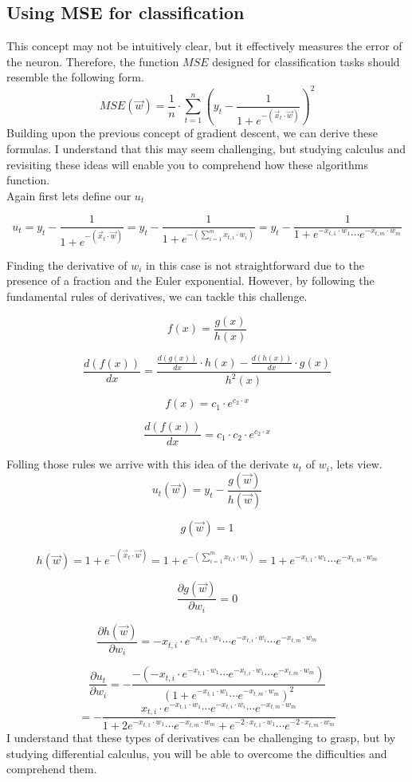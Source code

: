 \subsection{Using MSE for classification}
This concept may not be intuitively clear, but it effectively measures the error of the neuron.
Therefore, the function $MSE$ designed for classification tasks should resemble the following form.
\[
MSE(\vec{w}) = \frac{1}{n} \cdot \sum_{t = 1}^{n}(y_t - \frac{1}{1 + e^{-(\vec{x}_t \cdot \vec{w})}})^2
\]
Building upon the previous concept of gradient descent, we can derive these formulas. I understand that
this may seem challenging, but studying calculus and revisiting these ideas will enable you to comprehend
how these algorithms function.\\
Again first lets define our $u_t$

\[
u_t = y_t - \frac{1}{1 + e^{-(\vec{x}_t \cdot \vec{w})}} = y_t - \frac{1}{1 + e^{-(\sum_{i = 1}^m x_{t, i} \cdot w_i)}}
= y_t - \frac{1}{1 + e^{-x_{t, 1} \cdot w_1} \cdots e^{-x_{t, m} \cdot w_m}}
\]

Finding the derivative of $w_i$ in this case is not straightforward due to the presence of a fraction and
the Euler exponential. However, by following the fundamental rules of derivatives, we can tackle this challenge.

\[
f(x) = \frac{g(x)}{h(x)}
\]

\[
\frac{d(f(x))}{dx} = \frac{\frac{d(g(x))}{dx} \cdot h(x) - \frac{d(h(x))}{dx} \cdot g(x)}{h^2(x)}
\]

\[
f(x) = c_1 \cdot e^{c_2 \cdot x}
\]

\[
\frac{d(f(x))}{dx} = c_1 \cdot c_2 \cdot e^{c_2 \cdot x}
\]

Folling those rules we arrive with this idea of the derivate $u_t$ of $w_i$, lets view.
\[
u_t(\vec{w}) = y_t - \frac{g(\vec{w})}{h(\vec{w})}
\]

\[
g(\vec{w}) = 1
\]

\[
h(\vec{w}) = 1 + e^{-(\vec{x}_t \cdot \vec{w})} = 1 + e^{-(\sum_{i = 1}^m x_{t, i} \cdot w_i)}
= 1 + e^{-x_{t, 1} \cdot w_1} \cdots e^{-x_{t, m} \cdot w_m}
\]

\[
\frac{\partial g(\vec{w})}{\partial w_i} = 0
\]

\[
\frac{\partial h(\vec{w})}{\partial w_i}
= -x_{t, i} \cdot e^{-x_{t, 1} \cdot w_1} \cdots e^{-x_{t, i} \cdot w_i} \cdots e^{-x_{t, m} \cdot w_m}
\]

\[
\frac{\partial u_t}{\partial w_i} =
 - \frac{- (-x_{t, i} \cdot e^{-x_{t, 1} \cdot w_1} \cdots e^{-x_{t, i} \cdot w_i} \cdots e^{-x_{t, m} \cdot w_m})}
     {(1 + e^{-x_{t, 1} \cdot w_1} \cdots e^{-x_{t, m} \cdot w_m})^2}
     \]
     \[
     = - \frac{x_{t, i} \cdot e^{-x_{t, 1} \cdot w_1} \cdots e^{-x_{t, i} \cdot w_i} \cdots e^{-x_{t, m} \cdot w_m}}
     {1 + 2e^{-x_{t, 1} \cdot w_1} \cdots e^{-x_{t, m} \cdot w_m} + e^{-2 \cdot x_{t, 1} \cdot w_1} \cdots e^{-2 \cdot x_{t, m} \cdot w_m}}
\]
I understand that these types of derivatives can be challenging to grasp, but by studying
differential calculus, you will be able to overcome the difficulties and comprehend them.

